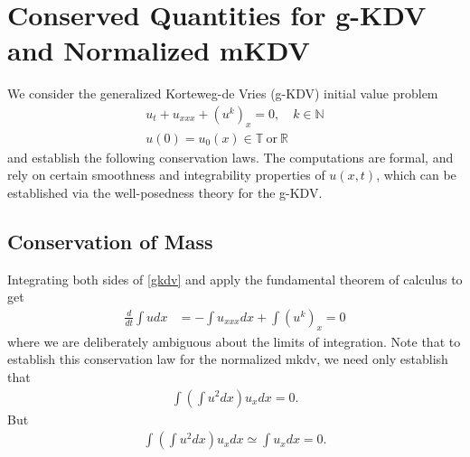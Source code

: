 \documentclass[12pt,reqno]{amsart}
\numberwithin{equation}{section}  %
\newcommand{\rr}{\mathbb{R}}
\newcommand{\ci}{\mathbb{T}}
\begin{document}
\appendix
%
%
%
%
%
%
%
%
%
%
%
%
\section{Conserved Quantities for g-KDV and Normalized mKDV}
We consider the generalized Korteweg-de Vries (g-KDV) initial value problem
%
%
\begin{gather}
  u_{t} + u_{xxx} + (u^{k})_{x} = 0, \quad k \in \mathbb{N}
  \label{gkdv}
  \\
  u(0) = u_{0}(x) \in \ci \ \text{or} \ \rr
  \label{gkdv-init}
\end{gather}
%
%
and establish the following conservation laws. The computations are formal, and
rely on certain smoothness and integrability properties of $u(x,t)$, which can
be established via the well-posedness theory for the g-KDV. 
\subsection{Conservation of Mass} 
\label{ssec:c-mass}
Integrating both sides of \eqref{gkdv} and apply the fundamental theorem of
calculus to get
%
%
\begin{equation*}
\begin{split}
  \frac{d}{dt} \int u dx & = - \int u_{xxx} dx + \int (u^{k})_{x}  = 0
\end{split}
\end{equation*}
%
%
where we are deliberately ambiguous about the limits of integration. 
Note that to establish this conservation law for the normalized mkdv, we need
only establish that
%
%
\begin{equation*}
\begin{split}
  \int \left ( \int u^{2} dx \right ) u_{x} dx = 0.
\end{split}
\end{equation*}
%
%
But 
\begin{equation*}
\begin{split}
  \int \left ( \int u^{2} dx \right ) u_{x} dx \simeq \int  u_{x} dx =
  0.
\end{split}
\end{equation*}
%
%
\end{document}
